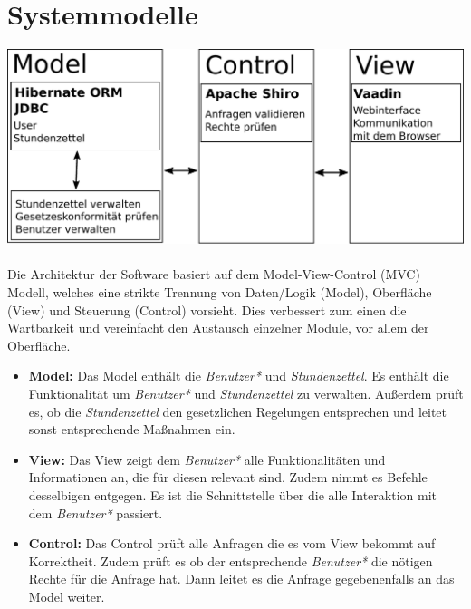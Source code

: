 \section{Systemmodelle}

\includegraphics[width=\linewidth]{mvc.pdf}\\
\\
Die Architektur der Software basiert auf dem Model-View-Control (MVC) Modell, welches eine strikte Trennung von Daten/Logik (Model), Oberfläche (View) und Steuerung (Control) vorsieht.
Dies verbessert zum einen die Wartbarkeit und vereinfacht den Austausch einzelner Module, vor allem der Oberfläche.
\begin{itemize}
	\item \textbf{Model:}
		Das Model enthält die \emph{Benutzer*} und \emph{Stundenzettel}.
		Es enthält die Funktionalität um \emph{Benutzer*} und \emph{Stundenzettel} zu verwalten.
		Außerdem prüft es, ob die \emph{Stundenzettel} den gesetzlichen Regelungen entsprechen und leitet sonst entsprechende Maßnahmen ein.
	\item \textbf{View:}
		Das View zeigt dem \emph{Benutzer*} alle Funktionalitäten und Informationen an, die für diesen relevant sind.
		Zudem nimmt es Befehle desselbigen entgegen.
		Es ist die Schnittstelle über die alle Interaktion mit dem \emph{Benutzer*} passiert.
	\item \textbf{Control:}
		Das Control prüft alle Anfragen die es vom View bekommt auf Korrektheit.
		Zudem prüft es ob der entsprechende \emph{Benutzer*} die nötigen Rechte für die Anfrage hat.
		Dann leitet es die Anfrage gegebenenfalls an das Model weiter.
\end{itemize}
